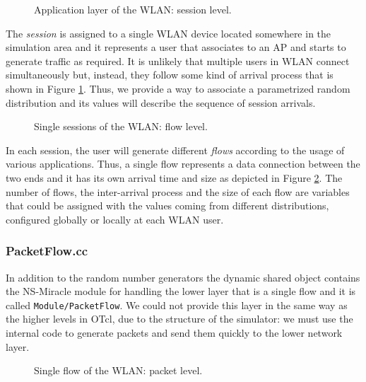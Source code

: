 \begin{figure}[htb]
	\begin{center}
		\scalebox{0.75}{}
	\end{center}
	\caption{Application layer of the \ac{WLAN}: session level.}
	\label{fig:wlan_session}
\end{figure}

The \textit{session} is assigned to a single \ac{WLAN} device located somewhere in the simulation area and it represents a user that associates to an \ac{AP} and starts to generate traffic as required. It is unlikely that multiple users in \ac{WLAN} connect simultaneously but, instead, they follow some kind of arrival process that is shown in Figure \ref{fig:wlan_session}. Thus, we provide a way to associate a parametrized random distribution and its values will describe the sequence of session arrivals.

\begin{figure}[htb]
	\begin{center}
		\scalebox{0.75}{}
	\end{center}
	\caption{Single sessions of the \ac{WLAN}: flow level.}
	\label{fig:wlan_flow}
\end{figure}

In each session, the user will generate different \textit{flows} according to the usage of various applications. Thus, a single flow represents a data connection between the two ends and it has its own arrival time and size as depicted in Figure \ref{fig:wlan_flow}. The number of flows, the inter-arrival process and the size of each flow are variables that could be assigned with the values coming from different distributions, configured globally or locally at each \ac{WLAN} user. 

\subsubsection{PacketFlow.cc}

In addition to the random number generators the dynamic shared object contains the \acs{NS-Miracle} module for handling the lower layer that is a single flow and it is called \texttt{Module/PacketFlow}. We could not provide this layer in the same way as the higher levels in \acs{OTcl}, due to the structure of the simulator: we must use the internal code to generate packets and send them quickly to the lower network layer.

\begin{figure}[htb]
	\begin{center}
		\scalebox{0.75}{}
	\end{center}
	\caption{Single flow of the \ac{WLAN}: packet level.}
	\label{fig:wlan_packet}
\end{figure}

